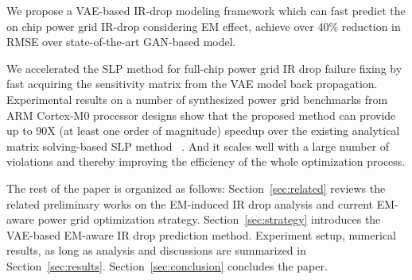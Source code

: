 \begin{itemlist}
	



\item We propose a VAE-based IR-drop modeling framework which can fast predict the on chip power grid IR-drop considering EM effect, achieve over 40$\%$ reduction in RMSE over state-of-the-art GAN-based model.   
	
\item We accelerated the SLP method for full-chip power grid IR drop failure fixing by fast acquiring the sensitivity matrix from the VAE model back propagation. 
 Experimental results on a number of synthesized power grid benchmarks from ARM Cortex-M0 processor designs show that the proposed method can provide up to 90X (at least one order of magnitude) speedup over the existing analytical matrix solving-based SLP method ~\cite{Sukharev:2019pg}.
 And it scales well  with a large number of violations and thereby improving the efficiency of the whole optimization process.
  
\end{itemlist}

The rest of the paper is organized as follows:
Section~\ref{sec:related} reviews the related preliminary works on the
EM-induced IR drop analysis and current EM-aware power grid
optimization strategy. Section~\ref{sec:strategy} introduces the
VAE-based EM-aware IR drop prediction method. Experiment setup, numerical results, as long as
analysis and discussions are summarized in Section~\ref{sec:results}.
Section~\ref{sec:conclusion} concludes the paper.
